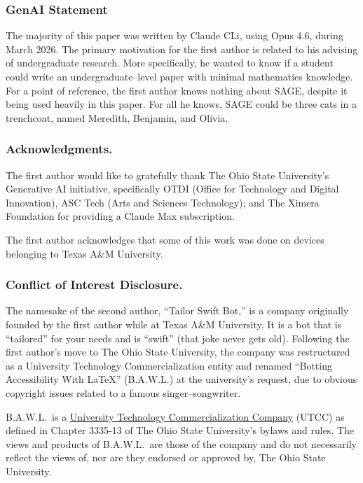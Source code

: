 \documentclass{ximera}
\begin{document}
\subsubsection{GenAI Statement}
The majority of this paper was written by Claude CLi, using Opus 4.6, during March 2026. The primary motivation for the first author is related to his advising of undergraduate research. More specifically, he wanted to know if a student could write an undergraduate--level paper with minimal mathematics knowledge. For a point of reference, the first author knows nothing about SAGE, despite it being used heavily in this paper. For all he knows, SAGE could be three cats in a trenchcoat, named Meredith, Benjamin, and Olivia.

\subsubsection{Acknowledgments.}
The first author would like to gratefully thank The Ohio State University's Generative AI initiative, specifically OTDI (Office for Technology and Digital Innovation), ASC Tech (Arts and Sciences Technology); and The Ximera Foundation for providing a Claude Max subscription. 

The first author acknowledges that some of this work was done on devices belonging to Texas A\&M University.

\subsubsection{Conflict of Interest Disclosure.}
The namesake of the second author, ``Tailor Swift Bot,'' is a company originally founded by the first author while at Texas A\&M University. It is a bot that is ``tailored'' for your needs and is ``swift'' (that joke never gets old). Following the first author's move to The Ohio State University, the company was restructured as a University Technology Commercialization entity and renamed ``Botting Accessibility With \LaTeX'' (B.A.W.L.) at the university's request, due to obvious copyright issues related to a famous singer--songwriter. 

B.A.W.L.\ is a \href{https://trustees.osu.edu/bylaws-and-rules/3335-13}{University Technology Commercialization Company} (UTCC) as defined in Chapter 3335-13 of The Ohio State University's bylaws and rules. The views and products of B.A.W.L.\ are those of the company and do not necessarily reflect the views of, nor are they endorsed or approved by, The Ohio State University.
\end{document}
